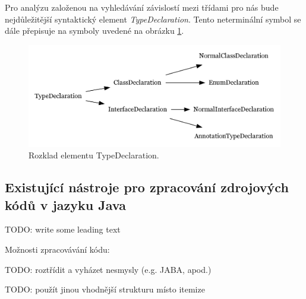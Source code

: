 Pro analýzu založenou na vyhledávání závislostí mezi třídami pro nás bude nejdůležitější syntaktický element \emph{TypeDeclaration}. Tento neterminální symbol se dále přepisuje na symboly uvedené na obrázku \ref{type_declaration_options}.

\begin{figure}[h!]
  \centering
  \includegraphics[width=\textwidth]{./graphs/toplevel_types.png}
  \caption{Rozklad elementu TypeDeclaration.\label{type_declaration_options}}
\end{figure}





\subsection{Existující nástroje pro zpracování zdrojových kódů v jazyku Java}

TODO: write some leading text

Možnosti zpracovávání kódu:

TODO: roztřídit a vyházet nesmysly (e.g. JABA, apod.)

TODO: použít jinou vhodnější strukturu místo itemize

